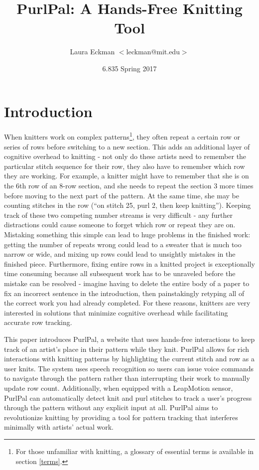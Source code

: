 \documentclass[11pt,twocolumn]{article}
\title{PurlPal: A Hands-Free Knitting Tool}
\author{Laura Eckman $<$leckman@mit.edu$>$}
\date{6.835 Spring 2017}
\begin{document}
\maketitle

\section{Introduction} \label{intro}

When knitters work on complex patterns\footnote{For those unfamiliar with knitting, a glossary of essential terms is available in section \ref{terms}.
}, they often repeat a certain row or series of rows before switching to a new section.
This adds an additional layer of cognitive overhead to knitting - not only do these artists need to remember the particular stitch sequence for their row, they also have to remember which row they are working.
For example, a knitter might have to remember that she is on the 6th row of an 8-row section, and she needs to repeat the section 3 more times before moving to the next part of the pattern.
At the same time, she may be counting stitches in the row (``on stitch 25, purl 2, then keep knitting'').
Keeping track of these two competing number streams is very difficult - any further distractions could cause someone to forget which row or repeat they are on.
Mistaking something this simple can lead to huge problems in the finished work:
getting the number of repeats wrong could lead to a sweater that is much too narrow or wide, and
mixing up rows could lead to unsightly mistakes in the finished piece.
Furthermore, fixing entire rows in a knitted project is exceptionally time consuming because all subsequent work has to be unraveled before the mistake can be resolved - imagine having to delete the entire body of a paper to fix an incorrect sentence in the introduction, then painstakingly retyping all of the correct work you had already completed.
For these reasons, knitters are very interested in solutions that minimize cognitive overhead while facilitating accurate row tracking.

This paper introduces PurlPal, a website that uses hands-free interactions to keep track of an artist's place in their pattern while they knit.
PurlPal allows for rich interactions with knitting patterns by highlighting the current stitch and row as a user knits.
The system uses speech recognition so users can issue voice commands to navigate through the pattern rather than interrupting their work to manually update row count.
Additionally, when equipped with a LeapMotion sensor, PurlPal can automatically detect knit and purl stitches to track a user's progress through the pattern without any explicit input at all.
PurlPal aims to revolutionize knitting by providing a tool for pattern tracking that interferes minimally with artists' actual work.
\end{document}
